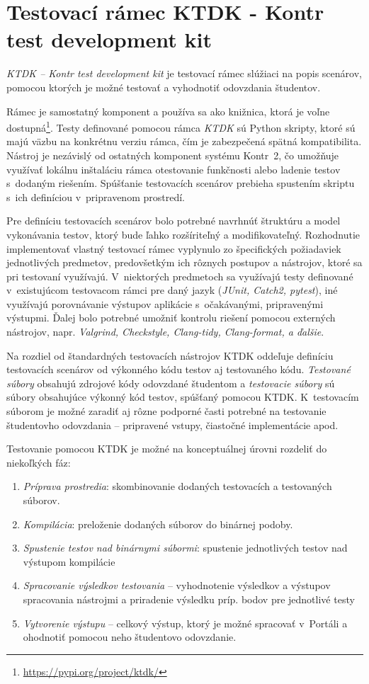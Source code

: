 \documentclass[
  digital, %
  oneside, %
  table,   %
  lof,     %
  lot,   %
]{fithesis3}
\begin{document}
\section{Testovací rámec KTDK - Kontr test development kit}

\emph{KTDK -- Kontr test development kit} je testovací rámec slúžiaci na popis scenárov, pomocou ktorých je možné testovať a vyhodnotiť odovzdania študentov.

Rámec je samostatný komponent a používa sa ako knižnica, ktorá je voľne dostupná\footnote{\url{https://pypi.org/project/ktdk/}}. Testy definované pomocou rámca \emph{KTDK} sú Python skripty, ktoré sú majú väzbu na konkrétnu verziu rámca, čím je zabezpečená spätná kompatibilita. Nástroj je nezávislý od ostatných komponent systému Kontr~2, čo umožňuje využívať lokálnu inštaláciu rámca  otestovanie funkčnosti alebo ladenie testov s~dodaným riešením. Spúšťanie testovacích scenárov prebieha spustením skriptu s~ich definíciou v~pripravenom prostredí.

Pre definíciu testovacích scenárov bolo potrebné navrhnúť štruktúru a model vykonávania testov, ktorý bude ľahko rozšíriteľný a modifikovateľný. Rozhodnutie implementovať vlastný testovací rámec vyplynulo zo špecifických požiadaviek jednotlivých predmetov, predovšetkým ich rôznych postupov a nástrojov, ktoré sa pri testovaní využívajú. V~niektorých predmetoch sa využívajú testy definované v~existujúcom testovacom rámci pre daný jazyk (\emph{JUnit, Catch2, pytest}), iné využívajú porovnávanie výstupov aplikácie s~očakávanými, pripravenými výstupmi. Ďalej bolo potrebné umožniť kontrolu riešení pomocou externých nástrojov, napr. \emph{Valgrind, Checkstyle, Clang-tidy, Clang-format, a ďalšie}.

Na rozdiel od štandardných testovacích nástrojov KTDK oddeľuje definíciu testovacích scenárov od výkonného kódu testov aj testovaného kódu. \emph{Testované súbory} obsahujú zdrojové kódy odovzdané študentom a \emph{testovacie súbory} sú súbory obsahujúce výkonný kód testov, spúšťaný pomocou KTDK. K~testovacím súborom je možné zaradiť aj rôzne podporné časti potrebné na testovanie študentovho odovzdania -- pripravené vstupy, čiastočné implementácie apod.

Testovanie pomocou KTDK je možné na konceptuálnej úrovni rozdeliť do niekoľkých fáz:
\begin{enumerate}
    \item \emph{Príprava prostredia}: skombinovanie dodaných testovacích a testovaných súborov.
    \item \emph{Kompilácia}: preloženie dodaných súborov do binárnej podoby.
    \item \emph{Spustenie testov nad binárnymi súbormi}: spustenie jednotlivých testov nad výstupom kompilácie
    \item \emph{Spracovanie výsledkov testovania} -- vyhodnotenie výsledkov a výstupov spracovania nástrojmi a priradenie výsledku príp. bodov pre jednotlivé testy
    \item \emph{Vytvorenie výstupu} -- celkový výstup, ktorý je možné spracovať v~Portáli a ohodnotiť pomocou neho študentovo odovzdanie.
\end{enumerate}
\end{document}
